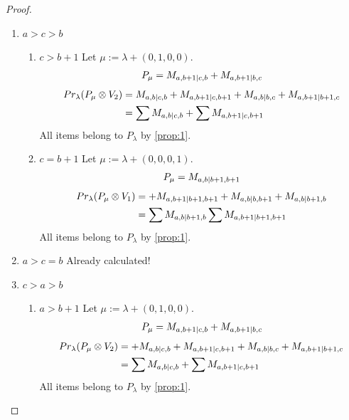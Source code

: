 \documentclass[12pt,a4paper]{article}
\begin{document}
\begin{proof}
\begin{enumerate}
\item $a>c>b$
  \begin{enumerate}
    \item $c>b+1$
        Let $\mu:=\lambda + (0,1,0,0) $. 
\begin{equation}\notag
  \begin{aligned}
      P_{\mu} = 
M_{a,b+1|c,b}
+M_{a,b+1|b,c}
  \end{aligned}
\end{equation}
\begin{equation}\notag
  \begin{aligned}
    Pr_{\lambda}(P_\mu \otimes V_2) &=
M_{a,b|c,b}
+M_{a,b+1|c,b+1}
+M_{a,b|b,c}
+M_{a,b+1|b+1,c} \\
                                    &=
\sum M_{a,b|c,b}
+\sum M_{a,b+1|c,b+1}
  \end{aligned}
\end{equation}
All items belong to $P_\lambda$ by \cref{prop:1}.
    \item $c=b+1 $
        Let $\mu:=\lambda + (0,0,0,1) $. 
\begin{equation}\notag
  \begin{aligned}
      P_{\mu} = M_{a,b|b+1,b+1}
  \end{aligned}
\end{equation}
\begin{equation}\notag
  \begin{aligned}
    Pr_{\lambda}(P_\mu \otimes V_1) &=
+M_{a,b+1|b+1,b+1}
+M_{a,b|b,b+1}
+M_{a,b|b+1,b}\\
                                    &=
\sum M_{a,b|b+1,b}
\sum M_{a,b+1|b+1,b+1}
  \end{aligned}
\end{equation}
All items belong to $P_\lambda$ by \cref{prop:1}.
    
  \end{enumerate}

\item $a>c=b$ Already calculated!
\item $c>a>b$
  \begin{enumerate}
    \item $a>b+1$
        Let $\mu:=\lambda + (0,1,0,0) $. 
\begin{equation}\notag
  \begin{aligned}
      P_{\mu} =
M_{a,b+1|c,b}
+M_{a,b+1|b,c}
  \end{aligned}
\end{equation}
\begin{equation}\notag
  \begin{aligned}
    Pr_{\lambda}(P_\mu \otimes V_2) &=
+M_{a,b|c,b}
+M_{a,b+1|c,b+1}
+M_{a,b|b,c}
+M_{a,b+1|b+1,c} \\
                                    &=
\sum M_{a,b|c,b}
+\sum M_{a,b+1|c,b+1}
  \end{aligned}
\end{equation}
All items belong to $P_\lambda$ by \cref{prop:1}.


\end{enumerate}
\end{enumerate}
\end{proof}
\end{document}
